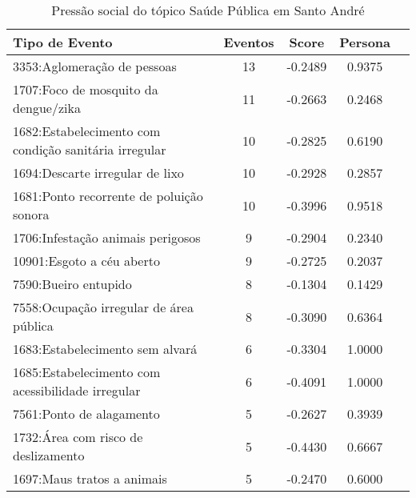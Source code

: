\begin{table}[htbp]
	\centering
	\caption{Pressão social do tópico Saúde Pública em Santo André}
	\label{tab:eventos_populares_sa}
	\begin{tabular}{|l|c|c|c|c|}
		\hline
		\textbf{Tipo de Evento}                               & \textbf{Eventos} & \textbf{Score} & \textbf{Persona} \\
		\hline
		3353:Aglomeração de pessoas                           & 13               & -0.2489        & 0.9375           \\
		\hline
		1707:Foco de mosquito da dengue/zika                  & 11               & -0.2663        & 0.2468           \\
		\hline
		1682:Estabelecimento com condição sanitária irregular & 10               & -0.2825        & 0.6190           \\
		\hline
		1694:Descarte irregular de lixo                       & 10               & -0.2928        & 0.2857           \\
		\hline
		1681:Ponto recorrente de poluição sonora              & 10               & -0.3996        & 0.9518           \\
		\hline
		1706:Infestação animais perigosos                     & 9                & -0.2904        & 0.2340           \\
		\hline
		10901:Esgoto a céu aberto                             & 9                & -0.2725        & 0.2037           \\
		\hline
		7590:Bueiro entupido                                  & 8                & -0.1304        & 0.1429           \\
		\hline
		7558:Ocupação irregular de área pública               & 8                & -0.3090        & 0.6364           \\
		\hline
		1683:Estabelecimento sem alvará                       & 6                & -0.3304        & 1.0000           \\
		\hline
		1685:Estabelecimento com acessibilidade irregular     & 6                & -0.4091        & 1.0000           \\
		\hline
		7561:Ponto de alagamento                              & 5                & -0.2627        & 0.3939           \\
		\hline
		1732:Área com risco de deslizamento                   & 5                & -0.4430        & 0.6667           \\
		\hline
		1697:Maus tratos a animais                            & 5                & -0.2470        & 0.6000           \\

\end{tabular}
\end{table}
